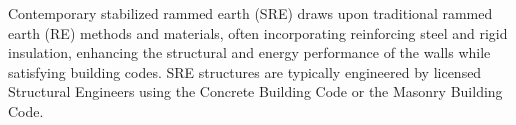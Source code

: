 Contemporary stabilized rammed earth (SRE) draws upon traditional rammed earth (RE) methods and materials, often incorporating reinforcing steel and rigid insulation, enhancing the structural and energy performance of the walls while satisfying building codes. SRE structures are typically engineered by licensed Structural Engineers using the Concrete Building Code or the Masonry Building Code.



%
%
%
%
